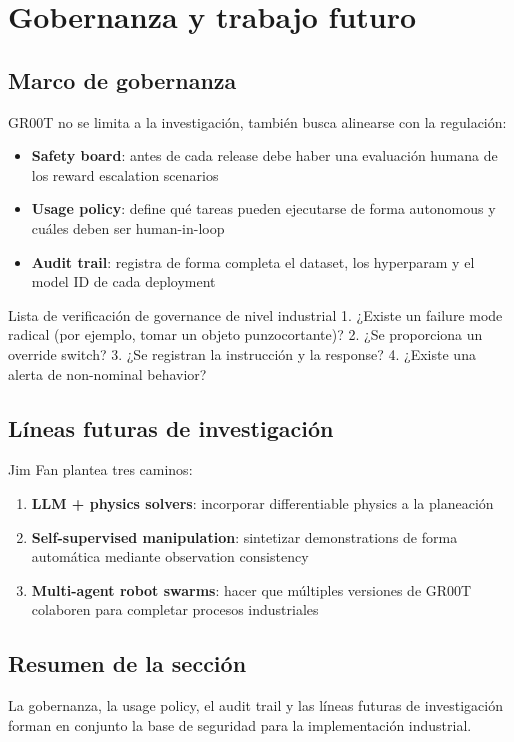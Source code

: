 \section{Gobernanza y trabajo futuro}

\subsection{Marco de gobernanza}

GR00T no se limita a la investigación, también busca alinearse con la regulación:

\begin{itemize}
    \item \textbf{Safety board}: antes de cada release debe haber una evaluación humana de los reward escalation scenarios
    \item \textbf{Usage policy}: define qué tareas pueden ejecutarse de forma autonomous y cuáles deben ser human-in-loop
    \item \textbf{Audit trail}: registra de forma completa el dataset, los hyperparam y el model ID de cada deployment
\end{itemize}

\begin{importantbox}{Lista de verificación de governance de nivel industrial}
1. ¿Existe un failure mode radical (por ejemplo, tomar un objeto punzocortante)? 2. ¿Se proporciona un override switch? 3. ¿Se registran la instrucción y la response? 4. ¿Existe una alerta de non-nominal behavior?
\end{importantbox}

\subsection{Líneas futuras de investigación}

Jim Fan plantea tres caminos:

\begin{enumerate}
    \item \textbf{LLM + physics solvers}: incorporar differentiable physics a la planeación
    \item \textbf{Self-supervised manipulation}: sintetizar demonstrations de forma automática mediante observation consistency
    \item \textbf{Multi-agent robot swarms}: hacer que múltiples versiones de GR00T colaboren para completar procesos industriales
\end{enumerate}

\subsection{Resumen de la sección}

La gobernanza, la usage policy, el audit trail y las líneas futuras de investigación forman en conjunto la base de seguridad para la implementación industrial.

